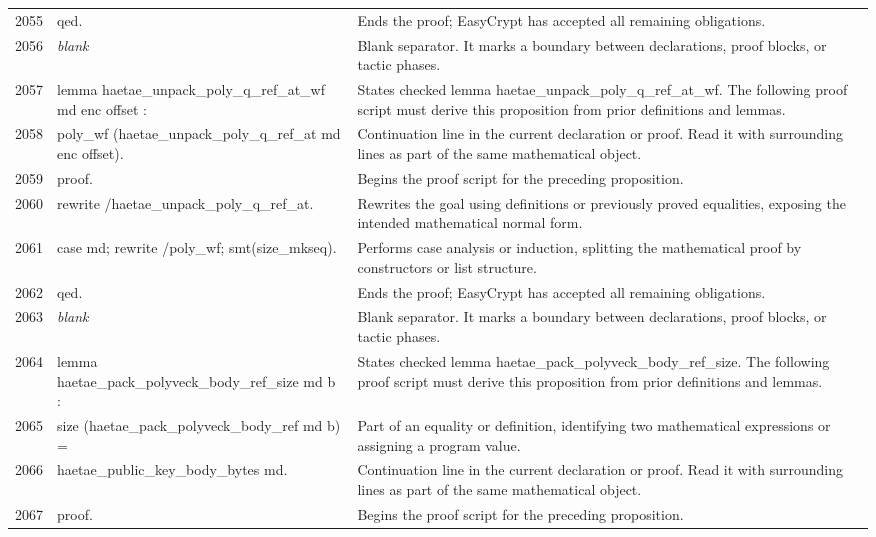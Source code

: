 \documentclass[10pt]{article}
\begin{document}
\begin{longtable}{r L{0.53\textwidth} L{0.37\textwidth}}
2055 & {\ttfamily\scriptsize qed.} & Ends the proof; EasyCrypt has accepted all remaining obligations. \\
2056 & {\ttfamily\scriptsize \emph{blank}} & Blank separator.  It marks a boundary between declarations, proof blocks, or tactic phases. \\
2057 & {\ttfamily\scriptsize lemma haetae\_unpack\_poly\_q\_ref\_at\_wf md enc offset :} & States checked lemma haetae\_unpack\_poly\_q\_ref\_at\_wf.  The following proof script must derive this proposition from prior definitions and lemmas. \\
2058 & {\ttfamily\scriptsize   poly\_wf (haetae\_unpack\_poly\_q\_ref\_at md enc offset).} & Continuation line in the current declaration or proof.  Read it with surrounding lines as part of the same mathematical object. \\
2059 & {\ttfamily\scriptsize proof.} & Begins the proof script for the preceding proposition. \\
2060 & {\ttfamily\scriptsize rewrite /haetae\_unpack\_poly\_q\_ref\_at.} & Rewrites the goal using definitions or previously proved equalities, exposing the intended mathematical normal form. \\
2061 & {\ttfamily\scriptsize case md; rewrite /poly\_wf; smt(size\_mkseq).} & Performs case analysis or induction, splitting the mathematical proof by constructors or list structure. \\
2062 & {\ttfamily\scriptsize qed.} & Ends the proof; EasyCrypt has accepted all remaining obligations. \\
2063 & {\ttfamily\scriptsize \emph{blank}} & Blank separator.  It marks a boundary between declarations, proof blocks, or tactic phases. \\
2064 & {\ttfamily\scriptsize lemma haetae\_pack\_polyveck\_body\_ref\_size md b :} & States checked lemma haetae\_pack\_polyveck\_body\_ref\_size.  The following proof script must derive this proposition from prior definitions and lemmas. \\
2065 & {\ttfamily\scriptsize   size (haetae\_pack\_polyveck\_body\_ref md b) =} & Part of an equality or definition, identifying two mathematical expressions or assigning a program value. \\
2066 & {\ttfamily\scriptsize     haetae\_public\_key\_body\_bytes md.} & Continuation line in the current declaration or proof.  Read it with surrounding lines as part of the same mathematical object. \\
2067 & {\ttfamily\scriptsize proof.} & Begins the proof script for the preceding proposition. \\

\end{longtable}
\end{document}
